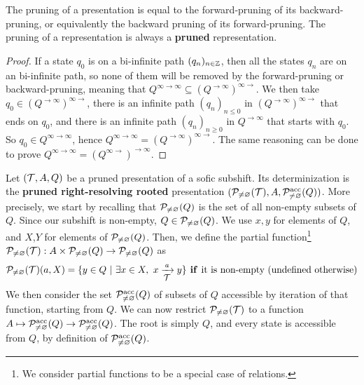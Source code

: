 \begin{lemma}\label{lem:double-pruning}
	The pruning of a presentation is equal to the forward-pruning of its backward-pruning, or equivalently the backward pruning of its forward-pruning. The pruning of a representation is always a \textbf{pruned} representation.
\end{lemma}
\begin{proof}
	If a state $q_0$ is on a bi-infinite path $(q_n)_{n \in {\mathbb{Z}}}$, then all the states $q_n$ are on an bi-infinite path, so none of them will be removed by the forward-pruning or backward-pruning, meaning that $Q^{\infty \to \infty} \subseteq (Q^{\to \infty})^{\infty \to}$. We then take $q_0 \in (Q^{\to \infty})^{\infty \to}$, there is an infinite path $(q_n)_{n \leq 0}$ in $(Q^{\to \infty})^{\infty \to}$ that ends on $q_0$, and there is an infinite path  $(q_n)_{n \geq 0}$ in $Q^{\to \infty}$ that starts with $q_0$. So $q_0 \in Q^{\infty \to \infty}$, hence $Q^{\infty \to \infty} = (Q^{\to \infty})^{\infty \to}$. The same reasoning can be done to prove $Q^{\infty \to \infty} = (Q^{\infty\to})^{\to\infty}$.
\end{proof}


\begin{definition}[Determinization]
	Let $({\mathcal{T}},A,Q)$ be a pruned presentation of a  sofic subshift. Its determinization is the \textbf{pruned right-resolving rooted} presentation $(\mathcal{P}_{\neq \varnothing}({\mathcal{T}}), A, \mathcal{P}_{\neq \varnothing}^{\textup{acc}}(Q))$.
	More precisely, we start by recalling that $\mathcal{P}_{\neq \varnothing}(Q)$ is the set of all non-empty subsets of $Q$. Since our subshift is non-empty, $Q \in \mathcal{P}_{\neq \varnothing}(Q)$. We use $x,y$ for elements of $Q$, and $X$,$Y$ for elements of $\mathcal{P}_{\neq \varnothing}(Q)$.  Then, we define the partial function\footnote{We consider partial functions to be a special case of relations.} $\mathcal{P}_{\neq \varnothing}({\mathcal{T}}): A \times \mathcal{P}_{\neq \varnothing}(Q) \to \mathcal{P}_{\neq \varnothing}(Q)$ as 
	\[ \mathcal{P}_{\neq \varnothing}({\mathcal{T}})(a,X)=\{y\in Q ~|~ \exists x\in X,~  x \xrightarrow[\text{\small ${\mathcal{T}}$}]{a} y \} \textbf{\textup{ if }}\text{it is non-empty (undefined otherwise)} \]
	We then consider the set $\mathcal{P}_{\neq \varnothing}^{\textup{acc}}(Q)$ of subsets of $Q$ accessible by iteration of that function, starting from $Q$. We can now restrict $\mathcal{P}_{\neq \varnothing}({\mathcal{T}})$ to a function $A \mapsto \mathcal{P}_{\neq \varnothing}^{\textup{acc}}(Q) \to \mathcal{P}_{\neq \varnothing}^{\textup{acc}}(Q)$. The root is simply $Q$, and every state is accessible from $Q$, by definition of $ \mathcal{P}_{\neq \varnothing}^{\textup{acc}}(Q)$.
\end{definition}


